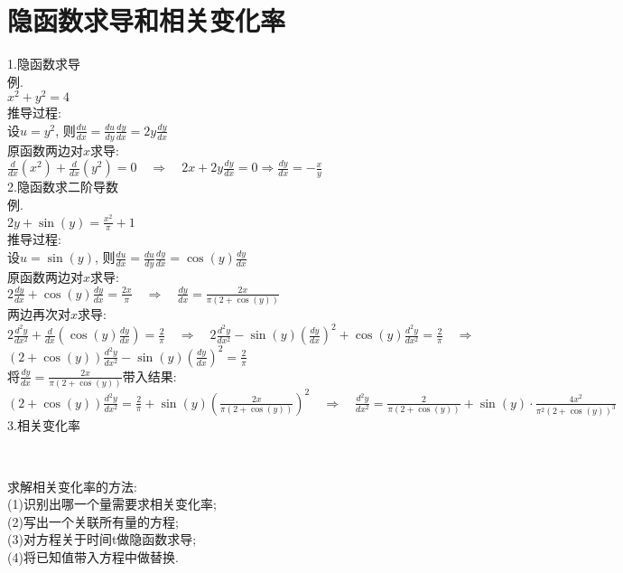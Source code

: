 \chapter{隐函数求导和相关变化率}
1.隐函数求导\\
例.\\
$x^2+y^2=4$\\[2ex]
推导过程:\\
设$u=y^2$, 则$\frac{du}{dx}=\frac{du}{dy}\frac{dy}{dx}=2y\frac{dy}{dx}$\\
原函数两边对$x$求导:\\[1ex]
$\displaystyle\frac{d}{dx}(x^2)+\frac{d}{dx}(y^2)=0\quad\Rightarrow\quad 2x+2y\frac{dy}{dx}=0\Rightarrow\frac{dy}{dx}=-\frac{x}{y}$\\[2ex]

2.隐函数求二阶导数\\
例.\\
$2y+\sin(y)=\frac{x^2}{\pi}+1$\\[2ex]
推导过程:\\
设$u=\sin(y)$, 则$\frac{du}{dx}=\frac{du}{dy}\frac{dy}{dx}=\cos(y)\frac{dy}{dx}$\\
原函数两边对$x$求导:\\[1ex]
$\displaystyle 2\frac{dy}{dx}+\cos(y)\frac{dy}{dx}=\frac{2x}{\pi}\quad\Rightarrow\quad\frac{dy}{dx}=\frac{2x}{\pi(2+\cos(y))}$\\[1ex]
两边再次对$x$求导:\\[1ex]
$\displaystyle 2\frac{d^2y}{dx^2}+\frac{d}{dx}(\cos(y)\frac{dy}{dx})=\frac{2}{\pi}\quad\Rightarrow\quad 2\frac{d^2y}{dx^2}-\sin(y)(\frac{dy}{dx})^2+\cos(y)\frac{d^2y}{dx^2}=\frac{2}{\pi}\quad\Rightarrow$\\
$\displaystyle (2+\cos(y))\frac{d^2y}{dx^2}-\sin(y)(\frac{dy}{dx})^2=\frac{2}{\pi}$\\[1ex]
将$\frac{dy}{dx}=\frac{2x}{\pi(2+\cos(y))}$带入结果:\\[1ex]
$\displaystyle (2+\cos(y))\frac{d^2y}{dx^2}=\frac{2}{\pi}+\sin(y)(\frac{2x}{\pi(2+\cos(y))})^2\quad\Rightarrow\quad\frac{d^2y}{dx^2}=\frac{2}{\pi(2+\cos(y))}+\sin(y)\cdot\frac{4x^2}{\pi^2(2+\cos(y))^3}$\\[2ex]

3.相关变化率\\[-3ex]
\begin{center}
\\
\end{center}\vspace{-1ex}
\begin{center}
\end{center}
求解相关变化率的方法:\\
(1)识别出哪一个量需要求相关变化率;\\
(2)写出一个关联所有量的方程;\\
(3)对方程关于时间t做隐函数求导;\\
(4)将已知值带入方程中做替换.\\


